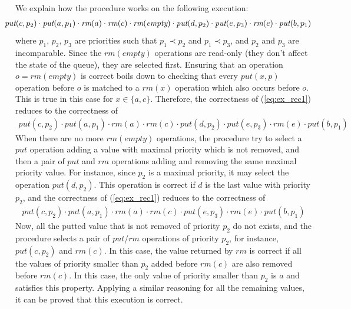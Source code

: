 We explain how the procedure works on the following execution:
\begin{align}
\hspace{-5mm}\textit{put}(c,p_2) \cdot \textit{put}(a,p_1) \cdot \textit{rm}(a) \cdot \textit{rm}(c) \cdot \textit{rm}(\textit{empty}) \cdot \textit{put}(d,p_2) \cdot \textit{put}(e,p_3) \cdot \textit{rm}(e) \cdot \textit{put}(b,p_1)\label{eq:ex_rec1}
\end{align}
where $p_1$, $p_2$, $p_3$ are priorities such that $p_1 \prec p_2$ and $p_1 \prec p_3$, and $p_2$ and $p_3$ are incomparable. Since the $\textit{rm}(\textit{empty})$ operations are read-only (they don't affect the state of the queue), they are selected first. Ensuring that an operation $o=\textit{rm}(\textit{empty})$ is correct boils down to checking that every $\textit{put}(x,p)$ operation before $o$ is matched to a $\textit{rm}(x)$ operation which also occurs before $o$. This is true in this case for $x\in \{a,c\}$. Therefore, the correctness of (\ref{eq:ex_rec1}) reduces to the correctness of
\begin{align*}
\textit{put}(c,p_2) \cdot \textit{put}(a,p_1) \cdot \textit{rm}(a) \cdot \textit{rm}(c) \cdot \textit{put}(d,p_2) \cdot \textit{put}(e,p_3) \cdot \textit{rm}(e) \cdot \textit{put}(b,p_1)
\end{align*}
{\color{blue}When there are no more $\textit{rm}(\textit{empty})$ operations, the procedure try to select a $\textit{put}$ operation adding a value with maximal priority which is not removed, and then a pair of $\textit{put}$ and $\textit{rm}$ operations adding and removing the same maximal priority value.} For instance, since $p_2$ is a maximal priority, it may select the operation $\textit{put}(d,p_2)$. {\color {blue}This operation is correct if $d$ is the last value with priority $p_2$,} and the correctness of (\ref{eq:ex_rec1}) reduces to the correctness of
\begin{align*}
\textit{put}(c,p_2) \cdot \textit{put}(a,p_1) \cdot \textit{rm}(a) \cdot \textit{rm}(c) \cdot \textit{put}(e,p_3) \cdot \textit{rm}(e) \cdot \textit{put}(b,p_1)
\end{align*}
{\color {blue}Now, all the putted value that is not removed of priority $p_2$ do not exists, and the procedure selects a pair of $\textit{put}$/$\textit{rm}$ operations of priority $p_2$,} for instance, $\textit{put}(c,p_2)$ and $\textit{rm}(c)$. In this case, the value returned by $\textit{rm}$ is correct if all the values of priority smaller than $p_2$ added before $\textit{rm}(c)$ are also removed before $\textit{rm}(c)$. In this case, the only value of priority smaller than $p_2$ is $a$ and satisfies this property. Applying a similar reasoning for all the remaining values, it can be proved that this execution is correct.

